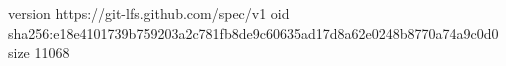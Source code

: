 version https://git-lfs.github.com/spec/v1
oid sha256:e18e4101739b759203a2c781fb8de9c60635ad17d8a62e0248b8770a74a9c0d0
size 11068
